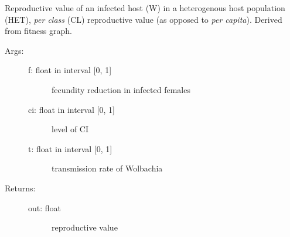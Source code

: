 \documentclass[letterpaper,10pt,english]{sphinxmanual}
\begin{document}
\begin{fulllineitems}
\label{index:wspec.analytical.reproval_WHETCL}
Reproductive value of an infected host (W) in a heterogenous host 
population (HET), \emph{per class} (CL) reproductive value (as opposed to \emph{per 
capita}). Derived from fitness graph.
\begin{description}
\item[{Args:}] \leavevmode\begin{description}
\item[{f: float in interval {[}0, 1{]}}] \leavevmode
fecundity reduction in infected females

\item[{ci: float in interval {[}0, 1{]}}] \leavevmode
level of CI

\item[{t: float in interval {[}0, 1{]}}] \leavevmode
transmission rate of Wolbachia

\end{description}

\item[{Returns:}] \leavevmode\begin{description}
\item[{out: float}] \leavevmode
reproductive value

\end{description}

\end{description}

\end{fulllineitems}

\end{document}
